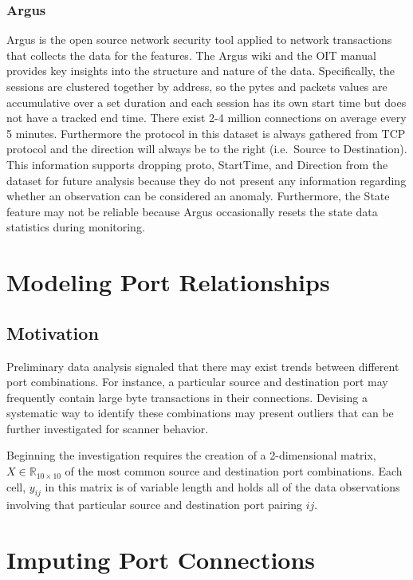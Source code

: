 \documentclass[12pt,twoside]{dukestatscithesis}
\theoremstyle{definition}
\theoremstyle{definition}
\theoremstyle{definition}
\theoremstyle{remark}
\begin{document}
\subsection{Argus}\label{argus}

Argus is the open source network security tool applied to network
transactions that collects the data for the features. The Argus wiki and
the OIT manual provides key insights into the structure and nature of
the data. Specifically, the sessions are clustered together by address,
so the pytes and packets values are accumulative over a set duration and
each session has its own start time but does not have a tracked end
time. There exist 2-4 million connections on average every 5 minutes.
Furthermore the protocol in this dataset is always gathered from TCP
protocol and the direction will always be to the right (i.e.~Source to
Destination). This information supports dropping proto, StartTime, and
Direction from the dataset for future analysis because they do not
present any information regarding whether an observation can be
considered an anomaly. Furthermore, the State feature may not be
reliable because Argus occasionally resets the state data statistics
during monitoring.

\chapter{Modeling Port Relationships}\label{modeling-port-relationships}

\section{Motivation}\label{motivation}

Preliminary data analysis signaled that there may exist trends between
different port combinations. For instance, a particular source and
destination port may frequently contain large byte transactions in their
connections. Devising a systematic way to identify these combinations
may present outliers that can be further investigated for scanner
behavior.

Beginning the investigation requires the creation of a 2-dimensional
matrix, \(X \in \mathbb{R}_{10 \times 10}\) of the most common source
and destination port combinations. Each cell, \(y_{ij}\) in this matrix
is of variable length and holds all of the data observations involving
that particular source and destination port pairing \(ij\).

\chapter{Imputing Port Connections}\label{imputing-port-connections}
\end{document}
